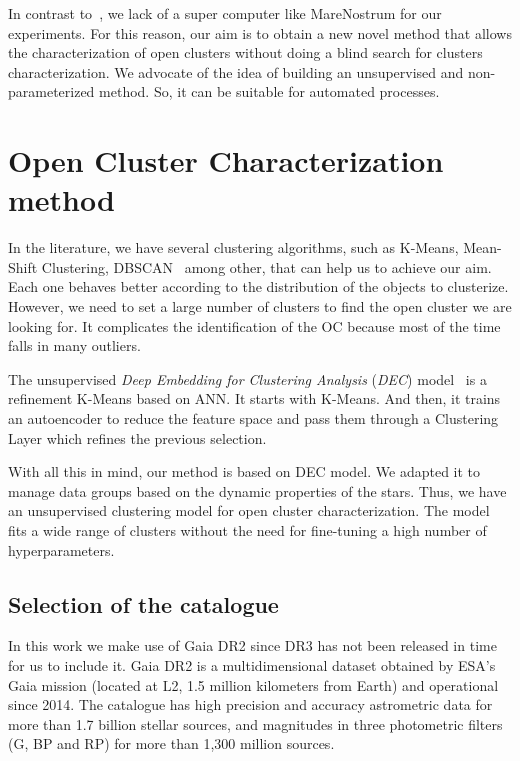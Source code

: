 \documentclass[11pt,a4paper,english,twocolumn]{article}
\begin{document}
In contrast to~\cite{castro2020hunting}, we lack of a super computer like MareNostrum
for our experiments. For this reason, our aim is to obtain a new novel method that
allows the characterization of open clusters without doing a blind search for clusters
characterization. We advocate of the idea of building an unsupervised and
non-parameterized method. So, it can be suitable for automated processes.

\section{Open Cluster Characterization method}
\label{sec:aims_and_method}

In the literature, we have several clustering algorithms, such as K-Means, Mean-Shift
Clustering, DBSCAN~\cite{ester1996density} among other, that can help us to achieve
our aim. Each one behaves better according to the distribution of the objects to
clusterize. However, we need to set a large number of clusters to find the open cluster
we are looking for. It complicates the identification of the OC because most of the
time falls in many outliers.

The unsupervised \emph{Deep Embedding for Clustering Analysis} (\emph{DEC})
model~\cite{xie2016unsupervised} is a refinement K-Means based on ANN. It starts with
K-Means. And then, it trains an autoencoder to reduce the feature space and pass them
through a Clustering Layer which refines the previous selection.

With all this in mind, our method is based on DEC model. We adapted it to manage data
groups based on the dynamic properties of the stars. Thus, we have an unsupervised
clustering model for open cluster characterization. The model fits a wide range of
clusters without the need for fine-tuning a high number of hyperparameters.

\subsection{Selection of the catalogue}

In this work we make use of Gaia DR2 since DR3 has not been released in time for us to
include it. Gaia DR2 is a multidimensional dataset obtained by ESA's Gaia mission
(located at L2, 1.5 million kilometers from Earth) and operational since 2014. The
catalogue has high precision and accuracy astrometric data for more than 1.7 billion
stellar sources, and magnitudes in three photometric filters (G, BP and RP) for more
than 1,300 million sources.
\end{document}
